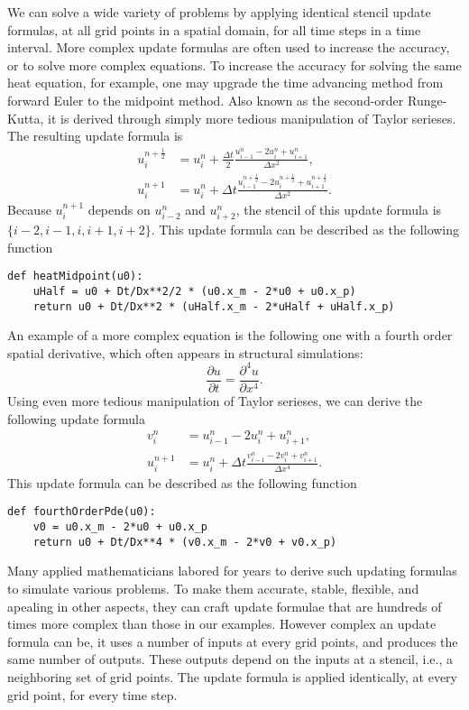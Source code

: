 \documentclass[12pt]{article}
\begin{document}
We can solve a wide variety of problems by applying identical stencil update formulas, at all grid points in a spatial domain, for all time steps in a time interval.  More complex update formulas are often used to increase the accuracy, or to solve more complex equations.
To increase the accuracy for solving the same heat equation, for example, one may upgrade the time advancing method from forward Euler to the midpoint method.  Also known as the second-order Runge-Kutta, it is derived through simply more tedious manipulation of Taylor serieses.  The resulting update formula is
\begin{equation}
\begin{aligned}
u_i^{n+\frac12} &= u_i^n + \frac{\Delta t}2 \frac{u_{i-1}^n - 2 u_i^n + u_{i+1}^n}{\Delta x^2}, \\
u_i^{n+1} &= u_i^n + \Delta t \frac{u_{i-1}^{n+\frac12} - 2 u_i^{n+\frac12} + u_{i+1}^{n+\frac12}}{\Delta x^2}.
\end{aligned}
\end{equation}
Because $u_i^{n+1}$ depends on $u_{i-2}^n$ and $u_{i+2}^n$, the stencil of this update formula is $\{i-2,i-1,i,i+1,i+2\}$.
This update formula can be described as the following function
\begin{lstlisting}
def heatMidpoint(u0):
    uHalf = u0 + Dt/Dx**2/2 * (u0.x_m - 2*u0 + u0.x_p)
    return u0 + Dt/Dx**2 * (uHalf.x_m - 2*uHalf + uHalf.x_p)
\end{lstlisting}
An example of a more complex equation is the following one with a fourth order spatial derivative, which often appears in structural simulations:
\begin{equation}
\frac{\partial u}{\partial t} = \frac{\partial^4 u}{\partial x^4}.
\end{equation}
Using even more tedious manipulation of Taylor serieses, we can derive the following update formula
\begin{equation} \label{update02}
\begin{aligned}
v_i^n &= u_{i-1}^n - 2 u_i^n + u_{i+1}^n, \\
u_i^{n+1} &= u_i^n + \Delta t \frac{v_{i-1}^n - 2 v_i^n + v_{i+1}^n}{\Delta x^4}.
\end{aligned}
\end{equation}
This update formula can be described as the following function
\begin{lstlisting}
def fourthOrderPde(u0):
    v0 = u0.x_m - 2*u0 + u0.x_p
    return u0 + Dt/Dx**4 * (v0.x_m - 2*v0 + v0.x_p)
\end{lstlisting}
Many applied mathematicians labored for years to derive such updating formulas to simulate various problems.  To make them accurate, stable, flexible, and apealing in other aspects, they can craft update formulae that are hundreds of times more complex than those in our examples.  However complex an update formula can be, it uses a number of inputs at every grid points, and produces the same number of outputs.  These outputs depend on the inputs at a stencil, i.e., a neighboring set of grid points.  The update formula is applied identically, at every grid point, for every time step.
\end{document}
